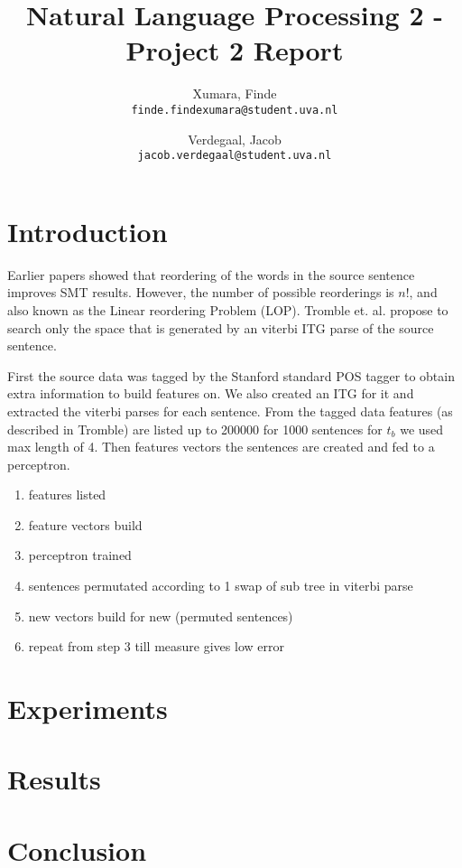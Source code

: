 \documentclass[11pt,DIV=11]{scrartcl}
\title{\small Natural Language Processing 2 - Project 2 Report \LARGE \\ \sc{\bf{Source Sentence Reordering for Better Translation}} }
\author{
    Xumara, Finde\\
    \texttt{finde.findexumara@student.uva.nl}
    \and
    Verdegaal, Jacob\\
    \texttt{jacob.verdegaal@student.uva.nl}
}
\begin{document}
\maketitle

\section{Introduction}
Earlier papers showed that reordering of the words in the source sentence improves SMT results. However, the number of possible reorderings is $n!$, and also known as the Linear reordering Problem (LOP). Tromble et. al. \cite{Tromble2009} propose to search only the space that is generated by an viterbi ITG parse of the source sentence.

First the source data was tagged by the Stanford standard POS tagger to obtain extra information to build features on.
We also created an ITG for it and extracted the viterbi parses for each sentence.
From the tagged data features (as described in Tromble) are listed up to 200000 for 1000 sentences for $t_b$ we used max length of 4.
Then features vectors the sentences are created and fed to a perceptron.

\begin{enumerate}
  \item features listed
  \item feature vectors build
  \item perceptron trained
  \item sentences permutated according to 1 swap of sub tree in viterbi parse
  \item new vectors build for new (permuted sentences)
  \item repeat from step 3 till measure gives low error
\end {enumerate}



\section{Experiments}
\label{experiments}

\section{Results}
\label{results}

\section{Conclusion}
\label{conclusion}


\pagebreak

{\small
	
}
\end{document}
